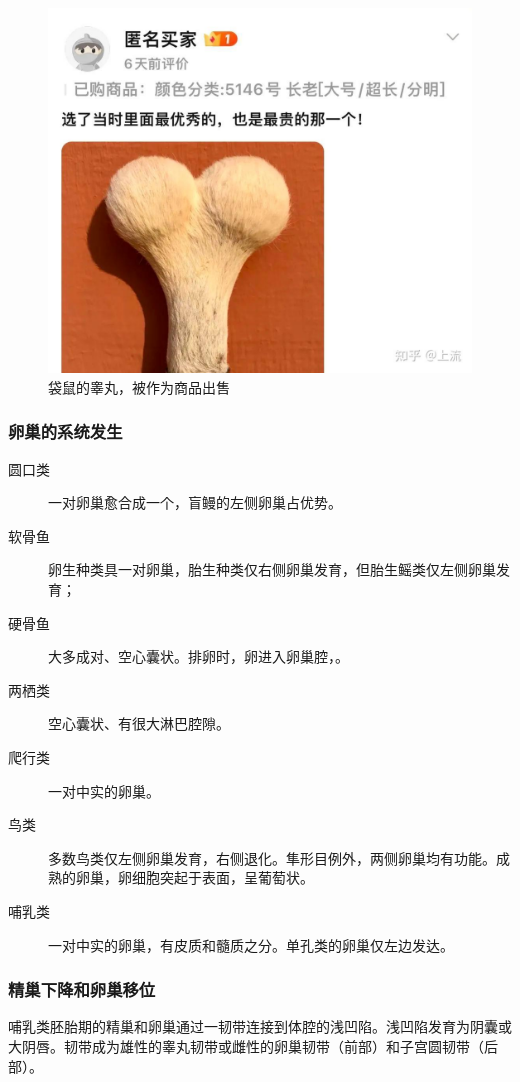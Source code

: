 \begin{figure}[htbp]
	\centering
	\includegraphics[width=0.7\linewidth]{Pics/袋鼠的睾丸}
	\caption{袋鼠的睾丸，被作为商品出售}
	\label{fig:ball_of_kangroo}
\end{figure}

\subsubsection{卵巢的系统发生}

\begin{description}
	\item[圆口类] 一对卵巢愈合成一个，盲鳗的左侧卵巢占优势。
	\item[软骨鱼] 卵生种类具一对卵巢，胎生种类仅右侧卵巢发育，但胎生鳐类仅左侧卵巢发育；
	\item[硬骨鱼] 大多成对、空心囊状。排卵时，卵进入卵巢腔，。
	\item[两栖类] 空心囊状、有很大淋巴腔隙。
	\item[爬行类] 一对中实的卵巢。
	\item[鸟类] 多数鸟类仅左侧卵巢发育，右侧退化。隼形目例外，两侧卵巢均有功能。成熟的卵巢，卵细胞突起于表面，呈葡萄状。
	\item[哺乳类] 一对中实的卵巢，有皮质和髓质之分。单孔类的卵巢仅左边发达。
\end{description}

\subsubsection{精巢下降和卵巢移位}

哺乳类胚胎期的精巢和卵巢通过一韧带连接到体腔的浅凹陷。浅凹陷发育为阴囊或大阴唇。韧带成为雄性的睾丸韧带或雌性的卵巢韧带（前部）和子宫圆韧带（后部）。

